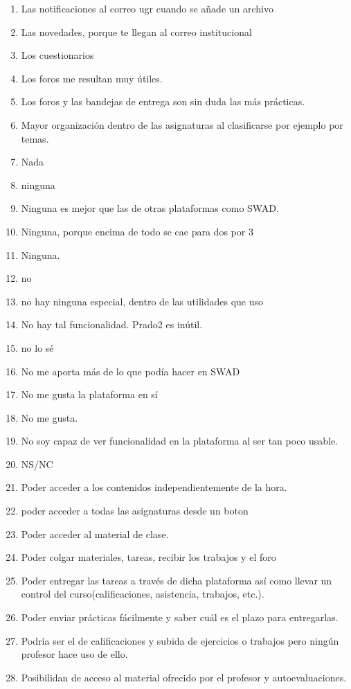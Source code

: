 \begin{enumerate}
\item Las notificaciones al correo ugr cuando se añade un archivo
\item Las novedades, porque te llegan al correo institucional
\item Los cuestionarios
\item Los foros me resultan muy útiles.
\item Los foros y las bandejas de entrega son sin duda las más prácticas.
\item Mayor organización dentro de las asignaturas al clasificarse por ejemplo por temas.
\item Nada
\item ninguna
\item Ninguna es mejor que las de otras plataformas como SWAD.
\item Ninguna, porque encima de todo se cae para dos por 3
\item Ninguna.
\item no
\item no hay ninguna especial, dentro de las utilidades que uso
\item No hay tal funcionalidad. Prado2 es inútil.
\item no lo sé
\item No me aporta más de lo que podía hacer en SWAD
\item No me gusta la plataforma en sí
\item No me gusta.
\item No soy capaz de ver funcionalidad en la plataforma al ser tan poco usable.
\item NS/NC
\item Poder acceder a los contenidos independientemente de la hora.
\item poder acceder a todas las asignaturas desde un boton
\item Poder acceder al material de clase.
\item Poder colgar materiales, tareas, recibir los trabajos y el foro
\item Poder entregar las tareas a través de dicha plataforma así como llevar un control del curso(calificaciones, asistencia, trabajos, etc.).
\item Poder enviar prácticas fácilmente y saber cuál es el plazo para entregarlas.
\item Podría ser el de calificaciones y subida de ejercicios o trabajos pero ningún profesor hace uso de ello.
\item Posibilidan de acceso al material ofrecido por el profesor y autoevaluaciones.

\end{enumerate}
